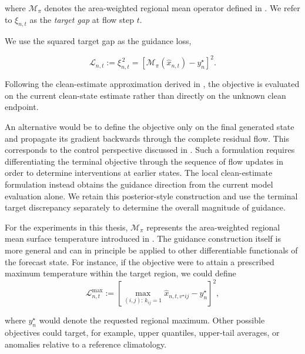 where $\mathcal{M}_\pi$ denotes the area-weighted regional mean operator
defined in . We refer to $\xi_{n,t}$ as the \emph{target gap}
at flow step $t$.

We use the squared target gap as the guidance loss,

\begin{equation}
    \mathcal{L}_{n,t}
    :=
    \xi_{n,t}^{\,2}
    =
    \left[
        \mathcal{M}_\pi
        \left(
            \hat{x}_{n,t}
        \right)
        -
        y_n^\star
    \right]^2.
    \label{eq:guidance-loss}
\end{equation}

Following the clean-estimate approximation derived in
, the objective is evaluated on the
current clean-state estimate rather than directly on the unknown clean
endpoint.

An alternative would be to define the objective only on the final generated
state and propagate its gradient backwards through the complete residual flow.
This corresponds to the control perspective discussed in
. Such a formulation requires differentiating the
terminal objective through the sequence of flow updates in order to determine
interventions at earlier states. The local clean-estimate formulation instead
obtains the guidance direction from the current model evaluation alone. We
retain this posterior-style construction and use the terminal target
discrepancy separately to determine the overall magnitude of guidance.

For the experiments in this thesis, $\mathcal{M}_\pi$ represents the
area-weighted regional mean surface temperature introduced in
. The guidance construction itself is more general and can in
principle be applied to other differentiable functionals of the forecast
state. 
For instance, if the objective were to attain a prescribed maximum temperature
within the target region, we could define
\begin{equation}
    \mathcal{L}_{n,t}^{\mathrm{max}}
    :=
    \left[
        \max_{(i,j):\,k_{ij}=1}
        \hat{x}_{n,t,v^\star ij}
        -
        y_n^\star
    \right]^2,
    \label{eq:guidance-loss-alternative}
\end{equation}

where $y_n^\star$ would denote the requested regional maximum. Other possible
objectives could target, for example, upper quantiles, upper-tail averages, or
anomalies relative to a reference climatology.

